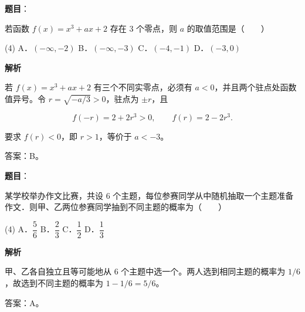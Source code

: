 \begin{answer}

\textbf{题目}：

若函数 $f(x)=x^3+ax+2$ 存在 $3$ 个零点，则 $a$ 的取值范围是\mbox{（　　）}

\begin{gkopts}(4)
\task A．$(-\infty,-2)$
\task B．$(-\infty,-3)$
\task C．$(-4,-1)$
\task D．$(-3,0)$
\end{gkopts}

\textbf{解析}

若 $f(x)=x^3+ax+2$ 有三个不同实零点，必须有 $a<0$，并且两个驻点处函数值异号。令 $r=\sqrt{-a/3}>0$，驻点为 $\pm r$，且

\nopagebreak[4]
\[
f(-r)=2+2r^3>0,\qquad f(r)=2-2r^3.
\]

要求 $f(r)<0$，即 $r>1$，等价于 $a<-3$。

答案：B。


\end{answer}
\begin{answer}

\textbf{题目}：

某学校举办作文比赛，共设 $6$ 个主题，每位参赛同学从中随机抽取一个主题准备作文．则甲、乙两位参赛同学抽到不同主题的概率为\mbox{（　　）}

\begin{gkopts}(4)
\task A．$\dfrac56$
\task B．$\dfrac23$
\task C．$\dfrac12$
\task D．$\dfrac13$
\end{gkopts}

\textbf{解析}

甲、乙各自独立且等可能地从 $6$ 个主题中选一个。两人选到相同主题的概率为 $1/6$，故选到不同主题的概率为 $1-1/6=5/6$。

答案：A。


\end{answer}
